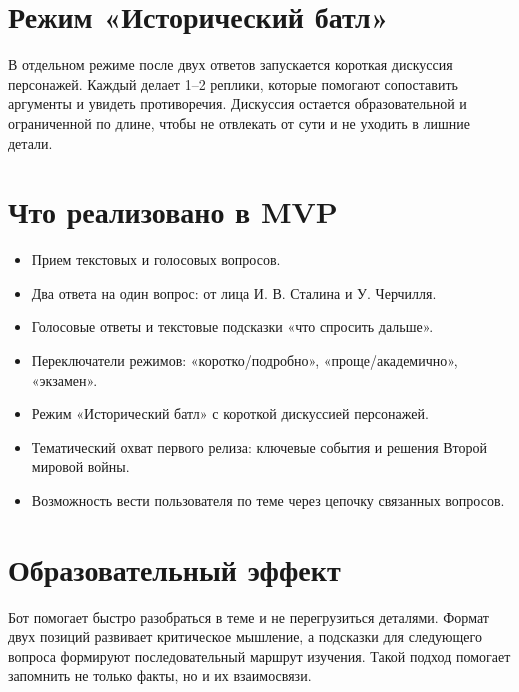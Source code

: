 \documentclass[a4paper,14pt]{extarticle}
\begin{document}
    \section{Режим «Исторический батл»}
    В отдельном режиме после двух ответов запускается короткая дискуссия персонажей. Каждый делает 1–2 реплики, которые помогают сопоставить аргументы и увидеть противоречия. Дискуссия остается образовательной и ограниченной по длине, чтобы не отвлекать от сути и не уходить в лишние детали.

    \section{Что реализовано в MVP}
    \begin{itemize}
        \item Прием текстовых и голосовых вопросов.
        \item Два ответа на один вопрос: от лица И. В. Сталина и У. Черчилля.
        \item Голосовые ответы и текстовые подсказки «что спросить дальше».
        \item Переключатели режимов: «коротко/подробно», «проще/академично», «экзамен».
        \item Режим «Исторический батл» с короткой дискуссией персонажей.
        \item Тематический охват первого релиза: ключевые события и решения Второй мировой войны.
        \item Возможность вести пользователя по теме через цепочку связанных вопросов.
    \end{itemize}

    \section{Образовательный эффект}
    Бот помогает быстро разобраться в теме и не перегрузиться деталями. Формат двух позиций развивает критическое мышление, а подсказки для следующего вопроса формируют последовательный маршрут изучения. Такой подход помогает запомнить не только факты, но и их взаимосвязи.
\end{document}
